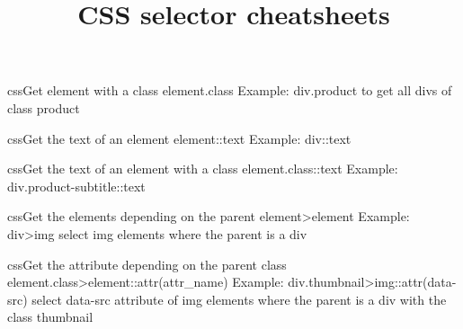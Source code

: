\documentclass[10pt,a4paper]{article}
\title{\color{w3schools}CSS selector cheatsheets
}
\begin{document}
\maketitle
\small
\begin{multicols}{3}

\thispagestyle{empty}
\scriptsize

% 




\begin{codebox}{css}{Get element with a class}
element.class
Example: div.product to get all divs of class product

\end{codebox}

\begin{codebox}{css}{Get the text of an element}
element::text
Example: div::text

\end{codebox}

\begin{codebox}{css}{Get the text of an element with a class}
element.class::text
Example: div.product-subtitle::text

\end{codebox}

\begin{codebox}{css}{Get the elements depending on the parent}
element>element
Example: div>img select img elements where the parent is a div

\end{codebox}

\begin{codebox}{css}{Get the attribute depending on the parent class}
element.class>element::attr(attr_name)
Example: div.thumbnail>img::attr(data-src) select data-src attribute of img 
elements where the parent is a div with the class thumbnail

\end{codebox}


\AtNextBibliography{\footnotesize}
\printbibliography  
\end{multicols}
\end{document}
